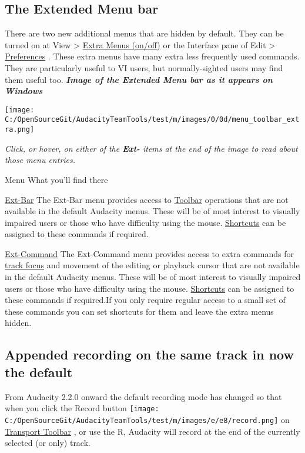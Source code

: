 \begin{multicols}{2}
\subsection{The Extended Menu bar}
\label{new:features:in:this:release:extendedmenubar}There are two new additional menus that are hidden by default.  They can be turned on at View > 
\hyperref[\foo{view:menu:extra:menus:onoff}]{Extra Menus (on/off)}
 or the Interface pane of Edit > 
\hyperref[\foo{interface:preferences:}]{Preferences}
.
These extra menus have many extra less frequently used commands.  They are particularly useful to VI users, but normally-sighted users may find them useful too.
\textit{\textbf{Image of the Extended Menu bar as it appears on Windows}}\par \protect\texttt{[image: C:/OpenSourceGit/AudacityTeamTools/test/m/images/0/0d/menu\_toolbar\_extra.png]}\par \textit{Click, or hover, on either of the \textbf{Ext-} items at the end of the image to read about those menu entries.}\par Menu
What you'll find there
\par 
\hyperref[\foo{ext:bar:menu:}]{Ext-Bar}
The Ext-Bar menu provides access to 
\hyperref[\foo{toolbars:overview:}]{Toolbar}
 operations that are not available in the default Audacity menus. These will be of most interest to visually impaired users or those who have difficulty using the mouse.
\hyperref[\foo{keyboard:preferences:}]{Shortcuts}
 can be assigned to these commands if required.\par 
\hyperref[\foo{ext:command:menu:}]{Ext-Command}
The Ext-Command menu provides access to extra commands for 
\hyperref[\foo{audio:tracks:focus}]{track focus}
 and movement of the editing or playback cursor that are not available in the default Audacity menus. These will be of most interest to visually impaired users or those who have difficulty using the mouse.
\hyperref[\foo{keyboard:preferences:}]{Shortcuts}
 can be assigned to these commands if required.If you only require regular access to a small set of these commands you can set shortcuts for them and leave the extra menus hidden.
\subsection{Appended recording on the same track in now the default}
\label{new:features:in:this:release:append}From Audacity 2.2.0 onward the default recording mode has changed so that when you click the Record button \protect\texttt{[image: C:/OpenSourceGit/AudacityTeamTools/test/m/images/e/e8/record.png]} on 
\hyperref[\foo{transport:toolbar:}]{Transport Toolbar}
, or use the R, Audacity will record at the end of the currently selected (or only) track.


\end{multicols}

